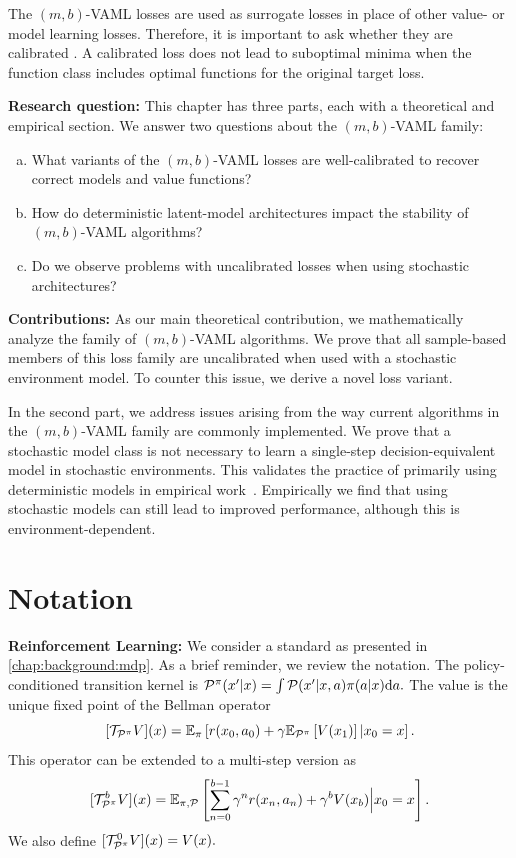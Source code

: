 The $(m,b)$-VAML losses are used as surrogate losses in place of other value- or model learning losses.
Therefore, it is important to ask whether they are calibrated \parencite{steinwart2008support}.
A calibrated loss does not lead to suboptimal minima when the function class includes optimal functions for the original target loss.

\textbf{Research question:} This chapter has three parts, each with a theoretical and empirical section. We answer two questions about the $(m,b)$-VAML family: 
\begin{enumerate}[(a)]
    \item What variants of the $(m,b)$-VAML losses are well-calibrated to recover correct models and value functions?
    \item How do deterministic latent-model architectures impact the stability of $(m,b)$-VAML algorithms?
    \item Do we observe problems with uncalibrated losses when using stochastic architectures?
\end{enumerate}

\textbf{Contributions:} 
As our main theoretical contribution, we mathematically analyze the family of $(m,b)$-VAML algorithms.
We prove that all sample-based members of this loss family are uncalibrated when used with a stochastic environment model.
To counter this issue, we derive a novel loss variant.

In the second part, we address issues arising from the way current algorithms in the $(m,b)$-VAML family are commonly implemented.
We prove that a stochastic model class is not necessary to learn a single-step decision-equivalent model in stochastic environments.
This validates the practice of primarily using deterministic models in empirical work~\parencite{oh2017value,schrittwieser2020mastering,hansen2022temporal}.
Empirically we find that using stochastic models can still lead to improved performance, although this is environment-dependent.


\section{Notation}

\textbf{Reinforcement Learning:} We consider a standard as presented in \autoref{chap:background:mdp}.
As a brief reminder, we review the notation.
The policy-conditioned transition kernel is $\P^\pi(x'|x) = \int \P(x'|x,a) \pi(a|x) \mathrm{d} a.$
The value is the unique fixed point of the Bellman operator $$[\mathcal{T}_{\P^\pi} V](x) = \EEX{\pi}{r(x_0,a_0) + \gamma  \EEX{\P^\pi}{V(x_1)}|x_0=x}.$$
This operator can be extended to a multi-step version as $$[{\mathcal{T}}^b_{\P^\pi} V](x) = \EEX{\pi,\P}{\sum_{n=0}^{b-1} \gamma^n r(x_n,a_n) + \gamma^b {V(x_b)}\Big|x_0=x}.$$
We also define $[\mathcal{T}_{\P^\pi}^0 V](x) = V(x).$

